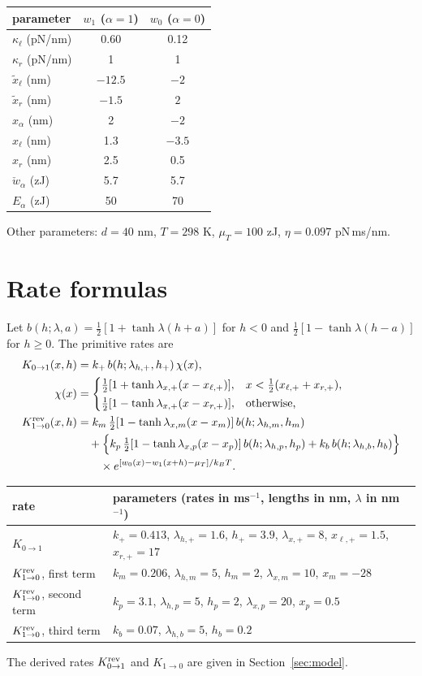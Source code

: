\documentclass[11pt,a4paper]{article}
\newcommand{\kBT}{k_BT}
\begin{document}
\begin{center}
\begin{tabular}{lcc}
\toprule
parameter & $w_1$ ($\alpha=1$) & $w_0$ ($\alpha=0$) \\
\midrule
$\kappa_\ell$ (pN/nm) & 0.60 & 0.12 \\
$\kappa_r$ (pN/nm) & 1 & 1 \\
$\tilde x_\ell$ (nm) & $-12.5$ & $-2$ \\
$\tilde x_r$ (nm) & $-1.5$ & $2$ \\
$x_\alpha$ (nm) & 2 & $-2$ \\
$x_\ell$ (nm) & 1.3 & $-3.5$ \\
$x_r$ (nm) & 2.5 & 0.5 \\
$\check w_\alpha$ (zJ) & 5.7 & 5.7 \\
$E_\alpha$ (zJ) & 50 & 70 \\
\bottomrule
\end{tabular}
\end{center}
Other parameters: $d=40$ nm, $T=298$ K, $\mu_T=100$ zJ, $\eta=0.097$ pN\,ms/nm.

\section{Rate formulas}
Let $b(h;\lambda,a)=\tfrac12[1+\tanh\lambda(h+a)]$ for $h<0$ and $\tfrac12[1-\tanh\lambda(h-a)]$ for $h\ge0$. The primitive rates are
\begin{align}
K_{0\to1}(x,h)&=k_+\,b(h;\lambda_{h,+},h_+)\,\chi(x),\\
\chi(x)&=\begin{cases}\tfrac12[1+\tanh\lambda_{x,+}(x-x_{\ell,+})],&x<\tfrac12(x_{\ell,+}+x_{r,+}),\\[2pt]\tfrac12[1-\tanh\lambda_{x,+}(x-x_{r,+})],&\text{otherwise,}\end{cases}\\
K^{\rm rev}_{1\to0}(x,h)&=k_m\,\tfrac12[1-\tanh\lambda_{x,m}(x-x_m)]\,b(h;\lambda_{h,m},h_m)\nonumber\\
&\quad+\Big\{k_p\,\tfrac12[1-\tanh\lambda_{x,p}(x-x_p)]\,b(h;\lambda_{h,p},h_p)+k_b\,b(h;\lambda_{h,b},h_b)\Big\}\nonumber\\
&\qquad\times e^{[w_0(x)-w_1(x+h)-\mu_T]/\kBT}.
\end{align}
\begin{center}
\begin{tabular}{ll}
\toprule
rate & parameters (rates in ms$^{-1}$, lengths in nm, $\lambda$ in nm$^{-1}$) \\
\midrule
$K_{0\to1}$ & $k_+=0.413$, $\lambda_{h,+}=1.6$, $h_+=3.9$, $\lambda_{x,+}=8$, $x_{\ell,+}=1.5$, $x_{r,+}=17$ \\
$K^{\rm rev}_{1\to0}$, first term & $k_m=0.206$, $\lambda_{h,m}=5$, $h_m=2$, $\lambda_{x,m}=10$, $x_m=-28$ \\
$K^{\rm rev}_{1\to0}$, second term & $k_p=3.1$, $\lambda_{h,p}=5$, $h_p=2$, $\lambda_{x,p}=20$, $x_p=0.5$ \\
$K^{\rm rev}_{1\to0}$, third term & $k_b=0.07$, $\lambda_{h,b}=5$, $h_b=0.2$ \\
\bottomrule
\end{tabular}
\end{center}
The derived rates $K^{\rm rev}_{0\to1}$ and $K_{1\to0}$ are given in Section~\ref{sec:model}.
\end{document}
